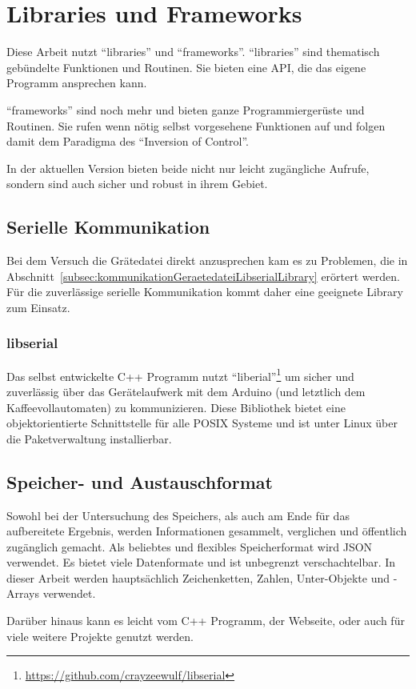 \section{Libraries und Frameworks}
Diese Arbeit nutzt "`libraries"' und "`frameworks"'.
"`libraries"' sind thematisch gebündelte Funktionen und Routinen. Sie bieten eine \ac{API}, die das eigene Programm ansprechen kann.

"`frameworks"' sind noch mehr und bieten ganze Programmiergerüste und Routinen. Sie rufen wenn nötig selbst vorgesehene Funktionen auf und folgen damit dem Paradigma des "`Inversion of Control"'.

In der aktuellen Version bieten beide nicht nur leicht zugängliche Aufrufe, sondern sind auch sicher und robust in ihrem Gebiet.

\subsection{Serielle Kommunikation}
Bei dem Versuch die Grätedatei direkt anzusprechen kam es zu Problemen, die in Abschnitt~\ref{subsec:kommunikationGeraetedateiLibserialLibrary} erörtert werden. Für die zuverlässige serielle Kommunikation kommt daher eine geeignete Library zum Einsatz.

\subsubsection{libserial}
Das selbst entwickelte C++ Programm nutzt "`liberial"'\footnote{\url{https://github.com/crayzeewulf/libserial}} um sicher und zuverlässig über das Gerätelaufwerk mit dem Arduino (und letztlich dem Kaffeevollautomaten) zu kommunizieren.
Diese Bibliothek bietet eine objektorientierte Schnittstelle für alle \ac{POSIX} Systeme und ist unter Linux über die Paketverwaltung installierbar.

\subsection{Speicher- und Austauschformat}
Sowohl bei der Untersuchung des Speichers, als auch am Ende für das aufbereitete Ergebnis, werden Informationen gesammelt, verglichen und öffentlich zugänglich gemacht.
Als beliebtes und flexibles Speicherformat wird \ac{JSON} verwendet.
Es bietet viele Datenformate und ist unbegrenzt verschachtelbar.
In dieser Arbeit werden hauptsächlich Zeichenketten, Zahlen, Unter-Objekte und -Arrays verwendet.

Darüber hinaus kann es leicht vom C++ Programm, der Webseite, oder auch für viele weitere Projekte genutzt werden.

